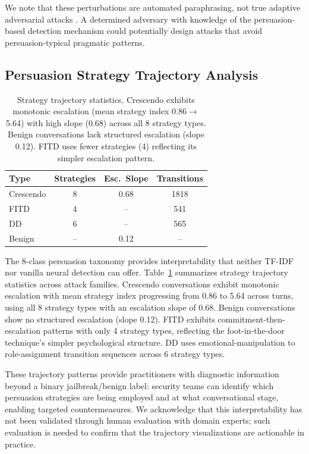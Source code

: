 \documentclass[11pt,a4paper]{article}
\begin{document}
We note that these perturbations are automated paraphrasing, not true adaptive adversarial attacks \cite{nasr2025adaptive}. A determined adversary with knowledge of the persuasion-based detection mechanism could potentially design attacks that avoid persuasion-typical pragmatic patterns.


\subsection{Persuasion Strategy Trajectory Analysis}
\label{sec:trajectories}

\begin{table}[t]
\centering
\small
\begin{tabular}{lccc}
\toprule
\textbf{Type} & \textbf{Strategies} & \textbf{Esc.\ Slope} & \textbf{Transitions} \\
\midrule
Crescendo & 8 & 0.68 & 1818 \\
FITD & 4 & -- & 541 \\
DD & 6 & -- & 565 \\
Benign & -- & 0.12 & -- \\
\bottomrule
\end{tabular}
\caption{Strategy trajectory statistics. Crescendo exhibits monotonic escalation (mean strategy index 0.86$\to$5.64) with high slope (0.68) across all 8 strategy types. Benign conversations lack structured escalation (slope 0.12). FITD uses fewer strategies (4) reflecting its simpler escalation pattern.}
\label{tab:trajectories}
\end{table}

The 8-class persuasion taxonomy provides interpretability that neither TF-IDF nor vanilla neural detection can offer. Table~\ref{tab:trajectories} summarizes strategy trajectory statistics across attack families. Crescendo conversations exhibit monotonic escalation with mean strategy index progressing from 0.86 to 5.64 across turns, using all 8 strategy types with an escalation slope of 0.68. Benign conversations show no structured escalation (slope 0.12). FITD exhibits commitment-then-escalation patterns with only 4 strategy types, reflecting the foot-in-the-door technique's simpler psychological structure. DD uses emotional-manipulation to role-assignment transition sequences across 6 strategy types.

These trajectory patterns provide practitioners with diagnostic information beyond a binary jailbreak/benign label: security teams can identify which persuasion strategies are being employed and at what conversational stage, enabling targeted countermeasures. We acknowledge that this interpretability has not been validated through human evaluation with domain experts; such evaluation is needed to confirm that the trajectory visualizations are actionable in practice.
\end{document}
